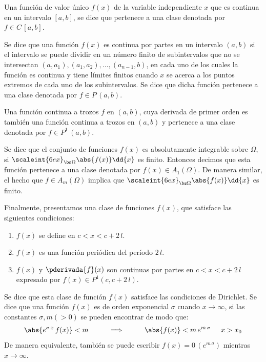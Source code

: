 Una función de valor único $f (x)$ de la variable independiente $x$ que es continua en un intervalo $[a, b]$, se dice que pertenece a una clase denotada por $f \in C \, [a, b]$.
\par
Se dice que una función $f (x)$ es continua por partes en un intervalo $(a, b)$ si el intervalo se puede dividir en un número finito de subintervalos que no se intersectan $(a, a_{1}), (a_{1}, a_{2}), \ldots, (a_{n -1}, b)$, en cada uno de los cuales la función es continua y tiene límites finitos cuando $x$ se acerca a los puntos extremos de cada uno de los subintervalos. Se dice que dicha función pertenece a una clase denotada por $f \in P \, (a, b)$.
\par
Una función continua a trozos $f$ en $(a, b)$, cuya derivada de primer orden es también una función continua a trozos en $(a, b)$ y pertenece a una clase denotada por $f \in P^{1} \, (a, b)$.
\par
Se dice que el conjunto de funciones $f (x)$ es absolutamente integrable sobre $\Omega$, si $\scaleint{6ex}_{\bs \Omega}  \abs{f (x)} \dd{x}$ es finito. Entonces decimos que esta función pertenece a una clase denotada por $f (x) \in A_{1} (\Omega)$. De manera similar, el hecho que $f \in A_{m} (\Omega)$ implica que $\scaleint{6ex}_{\bs \Omega}  \abs{f (x)} \dd{x}$ es finito.
\par
Finalmente, presentamos una clase de funciones $f (x)$, que satisface las siguientes condiciones:
\begin{enumerate}[label=\roman*]
\item $f (x)$ se define en $c < x < c + 2 \, l$.
\item $f (x)$ es una función periódica del período $2 \, l$.
\item $f (x)$ y $\pderivada{f} (x)$ son continuas por partes en $c  < x <c + 2 \, l$ expresado por $f (x) \in P^{1} (c, c + 2 \, l)$.
\end{enumerate}
Se dice que esta clase de función $f (x)$ satisface las condiciones de Dirichlet. Se dice que una función $f (x)$ es de orden exponencial $\sigma$ cuando $x \to \infty$, si las constantes $\sigma, m (> 0)$ se pueden encontrar de modo que:
\begin{align*}
\abs{ e^{\sigma \, x} \, f (x)} < m \hspace{1cm} \Longrightarrow \hspace{1cm} \abs{f (x)} < m \, e^{m \, \sigma} \hspace{0.5cm} x > x_{0}
\end{align*}
De manera equivalente, también se puede escribir $f (x) = 0 \, (e^{m \, \sigma})$ mientras $x \to \infty$.

